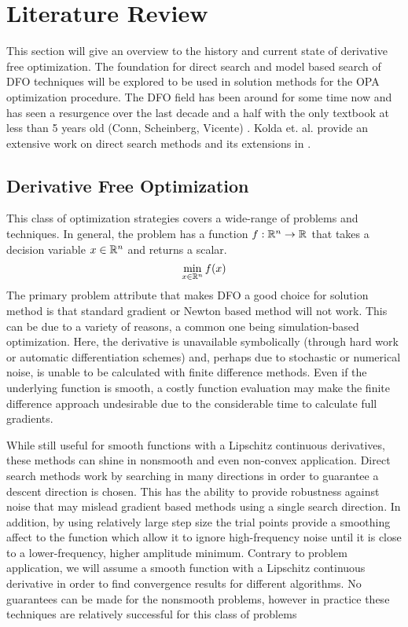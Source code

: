 \section{Literature Review}
This section will give an overview to the history and current state of derivative free optimization.  The foundation for direct search and model based search of DFO techniques will be explored to be used in solution methods for the OPA optimization procedure.  The DFO field has been around for some time now and has seen a resurgence over the last decade and a half with the only textbook at less than 5 years old (Conn, Scheinberg, Vicente) \cite{conn_2009}.  Kolda et. al. provide an extensive work on direct search methods and its extensions in \cite{kolda_2003}. 
\subsection{Derivative Free Optimization}
This class of optimization strategies covers a wide-range of problems and techniques.  In general, the problem has a function $f: \mathbb{R}^{n} \rightarrow \mathbb{R}^{}$ that takes a decision variable $x \in \mathbb{R}^{n}$ and returns a scalar. 
\begin{equation}
\min_{x \in \mathbb{R}^{n}} f(x)
\end{equation}
The primary problem attribute that makes DFO a good choice for solution method is that standard gradient or Newton based method will not work.  This can be due to a variety of reasons, a common one being simulation-based optimization.  Here, the derivative is unavailable symbolically (through hard work or automatic differentiation schemes) and, perhaps due to stochastic or numerical noise, is unable to be calculated with finite difference methods.  Even if the underlying function is smooth, a costly function evaluation may make the finite difference approach undesirable due to the considerable time to calculate full gradients.

While still useful for smooth functions with a Lipschitz continuous derivatives, these methods can shine in nonsmooth and even non-convex application.  Direct search methods work by searching in many directions in order to guarantee a descent direction is chosen.  This has the ability to provide robustness against noise that may mislead gradient based methods using a single search direction.  In addition, by using relatively large step size the trial points provide a smoothing affect to the function which allow it to ignore high-frequency noise until it is close to a lower-frequency, higher amplitude minimum.  Contrary to problem application, we will assume a smooth function with a Lipschitz continuous derivative in order to find convergence results for different algorithms.  No guarantees can be made for the nonsmooth problems, however in practice these techniques are relatively successful for this class of problems

